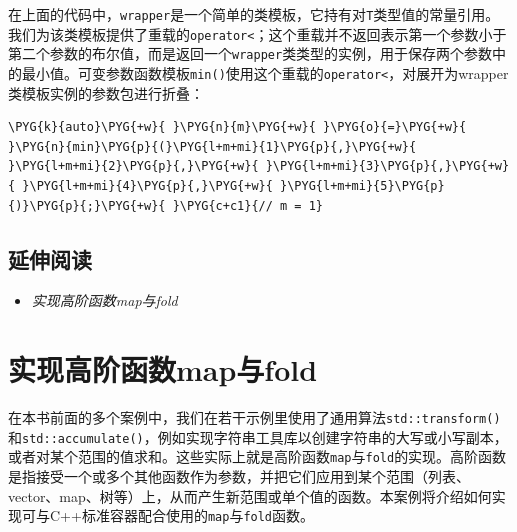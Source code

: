 
在上面的代码中，\texttt{wrapper}是一个简单的类模板，它持有对\texttt{T}类型值的常量引用。我们为该类模板提供了重载的\texttt{operator<}；这个重载并不返回表示第一个参数小于第二个参数的布尔值，而是返回一个\texttt{wrapper}类类型的实例，用于保存两个参数中的最小值。可变参数函数模板\texttt{min()}使用这个重载的\texttt{operator<}，对展开为wrapper类模板实例的参数包进行折叠：



\begin{codeblockbg}
\begin{Verbatim}[commandchars=\\\{\},breaklines=true,breakanywhere=true,fontsize=\codefont,xleftmargin=17bp]
\PYG{k}{auto}\PYG{+w}{ }\PYG{n}{m}\PYG{+w}{ }\PYG{o}{=}\PYG{+w}{ }\PYG{n}{min}\PYG{p}{(}\PYG{l+m+mi}{1}\PYG{p}{,}\PYG{+w}{ }\PYG{l+m+mi}{2}\PYG{p}{,}\PYG{+w}{ }\PYG{l+m+mi}{3}\PYG{p}{,}\PYG{+w}{ }\PYG{l+m+mi}{4}\PYG{p}{,}\PYG{+w}{ }\PYG{l+m+mi}{5}\PYG{p}{)}\PYG{p}{;}\PYG{+w}{ }\PYG{c+c1}{// m = 1}
\end{Verbatim}
\end{codeblockbg}



\subsection{延伸阅读}



\begin{itemize}
\item \textit{实现高阶函数map与fold}

\end{itemize}



\section{实现高阶函数map与fold}



在本书前面的多个案例中，我们在若干示例里使用了通用算法\texttt{std::\allowbreak{}transform()}和\texttt{std::\allowbreak{}accumulate()}，例如实现字符串工具库以创建字符串的大写或小写副本，或者对某个范围的值求和。这些实际上就是高阶函数\texttt{map}与\texttt{fold}的实现。高阶函数是指接受一个或多个其他函数作为参数，并把它们应用到某个范围（列表、vector、map、树等）上，从而产生新范围或单个值的函数。本案例将介绍如何实现可与C++标准容器配合使用的\texttt{map}与\texttt{fold}函数。


